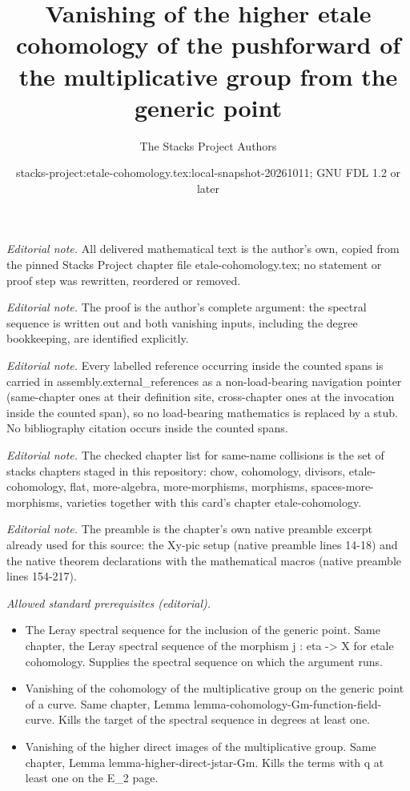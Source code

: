 \documentclass[10pt,a4paper]{amsart}
\title{Vanishing of the higher etale cohomology of the pushforward of the multiplicative group from the generic point}
\author{The Stacks Project Authors}
\date{stacks-project:etale-cohomology.tex:local-snapshot-20261011; GNU FDL 1.2 or later}
\theoremstyle{plain}
\theoremstyle{definition}
\theoremstyle{remark}
\numberwithin{equation}{subsection}
\begin{document}
\maketitle
\noindent\textit{Editorial note.} All delivered mathematical text is the author's own, copied from the pinned Stacks Project chapter file etale-cohomology.tex; no statement or proof step was rewritten, reordered or removed.\par\medskip
\noindent\textit{Editorial note.} The proof is the author's complete argument: the spectral sequence is written out and both vanishing inputs, including the degree bookkeeping, are identified explicitly.\par\medskip
\noindent\textit{Editorial note.} Every labelled reference occurring inside the counted spans is carried in assembly.external\_references as a non-load-bearing navigation pointer (same-chapter ones at their definition site, cross-chapter ones at the invocation inside the counted span), so no load-bearing mathematics is replaced by a stub. No bibliography citation occurs inside the counted spans.\par\medskip
\noindent\textit{Editorial note.} The checked chapter list for same-name collisions is the set of stacks chapters staged in this repository: chow, cohomology, divisors, etale-cohomology, flat, more-algebra, more-morphisms, morphisms, spaces-more-morphisms, varieties together with this card's chapter etale-cohomology.\par\medskip
\noindent\textit{Editorial note.} The preamble is the chapter's own native preamble excerpt already used for this source: the Xy-pic setup (native preamble lines 14-18) and the native theorem declarations with the mathematical macros (native preamble lines 154-217).\par\medskip
\noindent\textit{Allowed standard prerequisites (editorial).}\begin{itemize}
\item The Leray spectral sequence for the inclusion of the generic point. Same chapter, the Leray spectral sequence of the morphism j : eta -> X for etale cohomology. Supplies the spectral sequence on which the argument runs.
\item Vanishing of the cohomology of the multiplicative group on the generic point of a curve. Same chapter, Lemma lemma-cohomology-Gm-function-field-curve. Kills the target of the spectral sequence in degrees at least one.
\item Vanishing of the higher direct images of the multiplicative group. Same chapter, Lemma lemma-higher-direct-jstar-Gm. Kills the terms with q at least one on the E\_2 page.
\end{itemize}\medskip
\end{document}
